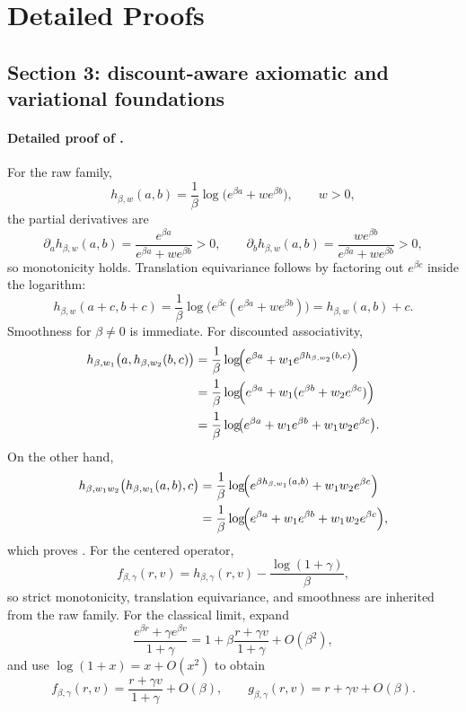 \documentclass{article}
\theoremstyle{remark}
\begin{document}
\section{Detailed Proofs}
\label{app:proofs}

\subsection{Section 3: discount-aware axiomatic and variational foundations}
\label{app:axioms}

\paragraph{Detailed proof of .}
For the raw family,
\[
 h_{\beta,w}(a,b)=\frac{1}{\beta}\log\!\bigl(e^{\beta a}+w e^{\beta b}\bigr),
\qquad w>0,
\]
the partial derivatives are
\[
\partial_a h_{\beta,w}(a,b)=\frac{e^{\beta a}}{e^{\beta a}+w e^{\beta b}}>0,
\qquad
\partial_b h_{\beta,w}(a,b)=\frac{w e^{\beta b}}{e^{\beta a}+w e^{\beta b}}>0,
\]
so monotonicity holds.
Translation equivariance follows by factoring out $e^{\beta c}$ inside the logarithm:
\[
 h_{\beta,w}(a+c,b+c)=\frac{1}{\beta}\log\!\bigl(e^{\beta c}(e^{\beta a}+w e^{\beta b})\bigr)=h_{\beta,w}(a,b)+c.
\]
Smoothness for $\beta\neq 0$ is immediate.
For discounted associativity,
\begin{align*}
 h_{\beta,w_1}\bigl(a,h_{\beta,w_2}(b,c)\bigr)
 &= \frac{1}{\beta}\log\!\Bigl(e^{\beta a}+w_1 e^{\beta h_{\beta,w_2}(b,c)}\Bigr)\\
 &= \frac{1}{\beta}\log\!\Bigl(e^{\beta a}+w_1(e^{\beta b}+w_2 e^{\beta c})\Bigr)\\
 &= \frac{1}{\beta}\log\!\bigl(e^{\beta a}+w_1 e^{\beta b}+w_1w_2 e^{\beta c}\bigr).
\end{align*}
On the other hand,
\begin{align*}
 h_{\beta,w_1w_2}\bigl(h_{\beta,w_1}(a,b),c\bigr)
 &= \frac{1}{\beta}\log\!\Bigl(e^{\beta h_{\beta,w_1}(a,b)}+w_1w_2 e^{\beta c}\Bigr)\\
 &= \frac{1}{\beta}\log\!\Bigl(e^{\beta a}+w_1 e^{\beta b}+w_1w_2 e^{\beta c}\Bigr),
\end{align*}
which proves .
For the centered operator,
\[
 f_{\beta,\gamma}(r,v)=h_{\beta,\gamma}(r,v)-\frac{\log(1+\gamma)}{\beta},
\]
so strict monotonicity, translation equivariance, and smoothness are inherited from the raw family.
For the classical limit, expand
\[
\frac{e^{\beta r}+\gamma e^{\beta v}}{1+\gamma}
=1+\beta\frac{r+\gamma v}{1+\gamma}+O(\beta^2),
\]
and use $\log(1+x)=x+O(x^2)$ to obtain
\[
 f_{\beta,\gamma}(r,v)=\frac{r+\gamma v}{1+\gamma}+O(\beta),
\qquad
 g_{\beta,\gamma}(r,v)=r+\gamma v+O(\beta).
\]
\end{document}
